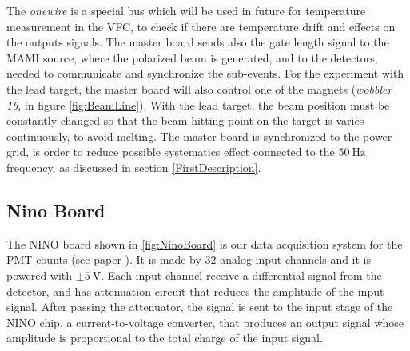 The \textit{onewire} is a special bus which will be used in future for temperature measurement in the VFC, to check if there are temperature drift and effects on the outputs signals. The master board sends also the gate length signal to the MAMI source, where the polarized beam is generated, and to the detectors, needed to communicate and synchronize the sub-events. 
For the experiment with the lead target, the master board will also control one of the magnets (\textit{wobbler 16}, in figure \ref{fig:BeamLine}). With the lead target, the beam position must be constantly changed so that the beam hitting point on the target is varies continuously, to avoid melting. The master board is synchronized to the power grid, is order to reduce possible systematics effect connected to the $\SI{50}{\hertz}$ frequency, as discussed in section \ref{FirstDescription}.

\subsection{Nino Board} \label{NINO}

The NINO board shown in \ref{fig:NinoBoard} is our data acquisition system for the PMT counts (see paper \cite{1352067}). It is made by $32$ analog input channels and it is powered with $\pm \SI{5}{\volt}$.
Each input channel receive a differential signal from the detector, and has attenuation circuit that reduces the amplitude of the input signal. After passing the attenuator, the signal is sent to the input stage of the NINO chip, a current-to-voltage converter, that produces an output signal whose amplitude is proportional to the total charge of the input signal.


